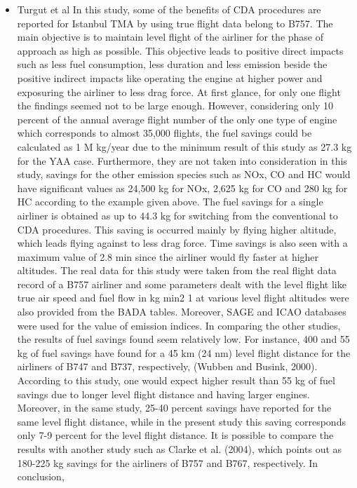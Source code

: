 \documentclass{aer1315-pretty}
\begin{document}
\begin{itemize}
\item Turgut et al \cite{Enis:2010}
In this study, some of the benefits of CDA procedures are
reported for Istanbul TMA by using true flight data belong to
B757. The main objective is to maintain level flight of the
airliner for the phase of approach as high as possible. This
objective leads to positive direct impacts such as less fuel
consumption, less duration and less emission beside the
positive indirect impacts like operating the engine at higher
power and exposuring the airliner to less drag force. At first
glance, for only one flight the findings seemed not to be large
enough. However, considering only 10 percent of the annual
average flight number of the only one type of engine which
corresponds to almost 35,000 flights, the fuel savings could be
calculated as 1 M kg/year due to the minimum result of this
study as 27.3 kg for the YAA case. Furthermore, they are not
taken into consideration in this study, savings for the other
emission species such as NOx, CO and HC would have
significant values as 24,500 kg for NOx, 2,625 kg for CO and
280 kg for HC according to the example given above.
The fuel savings for a single airliner is obtained as up to
44.3 kg for switching from the conventional to CDA
procedures. This saving is occurred mainly by flying higher
altitude, which leads flying against to less drag force. Time
savings is also seen with a maximum value of 2.8 min since the
airliner would fly faster at higher altitudes. The real data for
this study were taken from the real flight data record of a
B757 airliner and some parameters dealt with the level flight
like true air speed and fuel flow in kg min2 1 at various level
flight altitudes were also provided from the BADA tables.
Moreover, SAGE and ICAO databases were used for the
value of emission indices.
   In comparing the other studies, the results of fuel savings
found seem relatively low. For instance, 400 and 55 kg of fuel
savings have found for a 45 km (24 nm) level flight distance
for the airliners of B747 and B737, respectively, (Wubben and
Busink, 2000). According to this study, one would expect
higher result than 55 kg of fuel savings due to longer level
flight distance and having larger engines. Moreover, in the
same study, 25-40 percent savings have reported for the same
level flight distance, while in the present study this saving
corresponds only 7-9 percent for the level flight distance. It is
possible to compare the results with another study such
as Clarke et al. (2004), which points out as 180-225 kg savings
for the airliners of B757 and B767, respectively. In conclusion,

\end{itemize}
\end{document}
